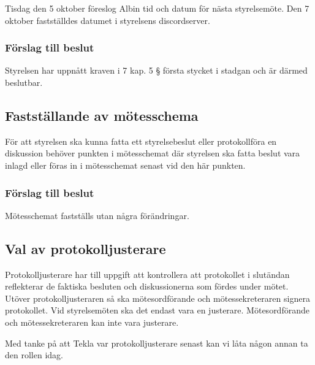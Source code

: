 \documentclass[protokoll]{dvd}
\begin{document}
Tisdag den 5 oktober föreslog Albin tid och datum för nästa styrelsemöte.
Den 7 oktober fastställdes datumet i styrelsens discordserver.

\subsubsection*{Förslag till beslut}

\begin{attsatser}
    \item Styrelsen har uppnått kraven i 7 kap. 5 § första stycket i stadgan och är därmed beslutbar.
\end{attsatser}




\subsection{Fastställande av mötesschema}

För att styrelsen ska kunna fatta ett styrelsebeslut eller protokollföra en diskussion behöver punkten i mötesschemat där styrelsen ska fatta beslut vara inlagd eller föras in i mötesschemat senast vid den här punkten.

\subsubsection*{Förslag till beslut}

\begin{attsatser}
    \item Mötesschemat fastställs utan några förändringar.
\end{attsatser}





\subsection{Val av protokolljusterare}

Protokolljusterare har till uppgift att kontrollera att protokollet i slutändan reflekterar de faktiska besluten och diskussionerna som fördes under mötet.
Utöver protokolljusteraren så ska mötesordförande och mötessekreteraren signera protokollet.
Vid styrelsemöten ska det endast vara en justerare.
Mötesordförande och mötessekreteraren kan inte vara justerare.

Med tanke på att Tekla var protokolljusterare senast kan vi låta någon annan ta den rollen idag.
\end{document}
